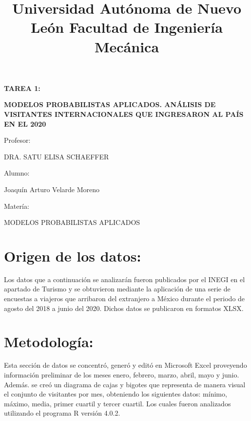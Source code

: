 \documentclass[]{article}
\title{Universidad Autónoma de Nuevo León
Facultad de Ingeniería Mecánica}
\date{}
\begin{document}
	\maketitle
	\begin{center}


\centerline{\textbf{TAREA 1:} } 
\textbf{MODELOS PROBABILISTAS APLICADOS. 
ANÁLISIS DE VISITANTES INTERNACIONALES 
QUE INGRESARON AL PAÍS EN EL 2020}
\linebreak
\linebreak
\linebreak
\linebreak
\linebreak
\linebreak
\centerline{Profesor: } 
\centerline{DRA. SATU ELISA SCHAEFFER}
\linebreak
\linebreak
\linebreak
\centerline{Alumno: } 
\centerline{Joaquín Arturo Velarde Moreno}
\linebreak
\linebreak
\linebreak
\centerline{Matería: } 
\centerline{MODELOS PROBABILISTAS APLICADOS}
	\end{center}
	
		\cite{inegi}
		
		
\newpage

\section*{Origen de los datos:}
Los datos que a continuación se analizarán fueron publicados por el INEGI\cite{inegi} en el apartado de Turismo y se obtuvieron mediante la aplicación de una serie de encuestas a viajeros que arribaron del extranjero a México durante el periodo de agosto del 2018 a junio del 2020. Dichos datos se publicaron en formatos XLSX.

\section*{Metodología:}
Esta sección de datos se concentró, generó y editó en Microsoft Excel\cite{excel} proveyendo información preliminar de los meses enero, febrero, marzo, abril, mayo y junio.\\

Además. se creó un diagrama de cajas y bigotes que representa de manera visual el conjunto de visitantes por mes, obteniendo los siguientes datos: mínimo, máximo, media, primer cuartil y tercer cuartil. Los cuales fueron analizados utilizando el programa R versión 4.0.2\cite{rproject}.\\
\end{document}
